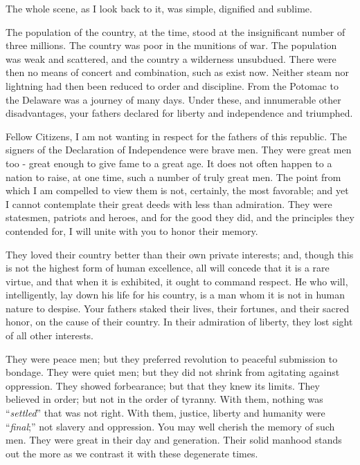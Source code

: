 The whole scene, as I look back to it, was simple, dignified and sublime.\par

The population of the country, at the time, stood at the insignificant number of three millions. The country was poor in the munitions of war. The population was weak and scattered, and the country a wilderness unsubdued. There were then no means of concert and combination, such as exist now. Neither steam nor lightning had then been reduced to order and discipline. From the Potomac to the Delaware was a journey of many days. Under these, and innumerable other disadvantages, your fathers declared for liberty and independence and triumphed.\par

Fellow Citizens, I am not wanting in respect for the fathers of this republic. The signers of the Declaration of Independence were brave men. They were great men too - great enough to give fame to a great age. It does not often happen to a nation to raise, at one time, such a number of truly great men. The point from which I am compelled to view them is not, certainly, the most favorable; and yet I cannot contemplate their great deeds with less than admiration. They were statesmen, patriots and heroes, and for the good they did, and the principles they contended for, I will unite with you to honor their memory.\par

They loved their country better than their own private interests; and, though this is not the highest form of human excellence, all will concede that it is a rare virtue, and that when it is exhibited, it ought to command respect. He who will, intelligently, lay down his life for his country, is a man whom it is not in human nature to despise. Your fathers staked their lives, their fortunes, and their sacred honor, on the cause of their country. In their admiration of liberty, they lost sight of all other interests.\par

They were peace men; but they preferred revolution to peaceful submission to bondage. They were quiet men; but they did not shrink from agitating against oppression. They showed forbearance; but that they knew its limits. They believed in order; but not in the order of tyranny. With them, nothing was “\textit{settled}” that was not right. With them, justice, liberty and humanity were “\textit{final};” not slavery and oppression. You may well cherish the memory of such men. They were great in their day and generation. Their solid manhood stands out the more as we contrast it with these degenerate times.\par

